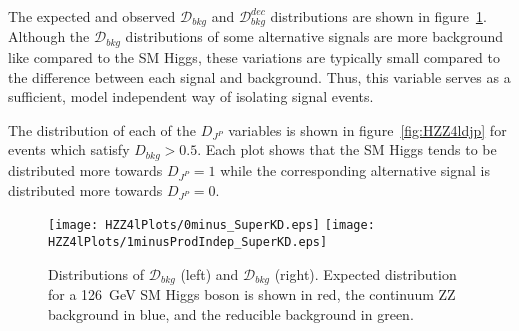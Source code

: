 The expected and observed $\mathscr{D}_{bkg}$ and 
$\mathscr{D}_{bkg}^{dec}$ distributions are shown in 
figure~\ref{fig:HZZ4lsuperMELA}.  
Although the $\mathscr{D}_{bkg}$ distributions of some 
alternative signals are more background 
like compared to the SM Higgs, these variations are typically 
small compared to the difference between each signal and 
background.  Thus, this variable serves as a sufficient, model 
independent way of isolating signal events.  

The distribution of each of the $D_{J^P}$ variables is shown in 
figure~\ref{fig:HZZ4ldjp} for events which satisfy
$D_{bkg}>0.5$.  Each plot shows that the SM 
Higgs tends
to be distributed more towards $D_{J^P}=1$ while the corresponding
alternative signal is distributed more towards $D_{J^P}=0$. 

\begin{figure}
\begin{center}
\texttt{[image: HZZ4lPlots/0minus\_SuperKD.eps]}
\texttt{[image: HZZ4lPlots/1minusProdIndep\_SuperKD.eps]}
\caption{Distributions of $\mathscr{D}_{bkg}$
(left) and $\mathscr{D}_{bkg}$ (right).  Expected distribution
for a 126~GeV SM Higgs boson is shown in red, the continuum ZZ
background in blue, and the reducible background in green.}
\label{fig:HZZ4lsuperMELA}
\end{center}
\end{figure}

